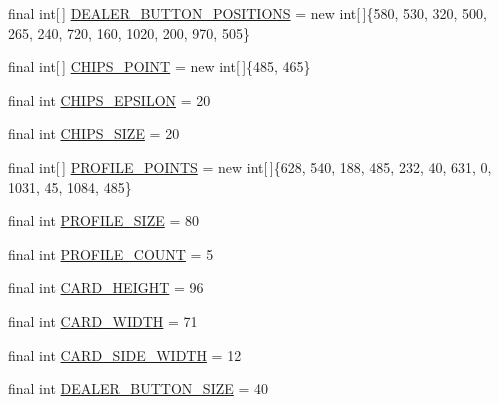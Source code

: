 \begin{DoxyCompactItemize}
\item 
final int\mbox{[}$\,$\mbox{]} \hyperlink{classhu_1_1elte_1_1bfw1p6_1_1poker_1_1client_1_1defaultvalues_1_1_abstract_default_values_a57bc1aea0ed304293a9a958b25011e85}{D\+E\+A\+L\+E\+R\+\_\+\+B\+U\+T\+T\+O\+N\+\_\+\+P\+O\+S\+I\+T\+I\+O\+N\+S} = new int\mbox{[}$\,$\mbox{]}\{580, 530, 320, 500, 265, 240, 720, 160, 1020, 200, 970, 505\}
\item 
final int\mbox{[}$\,$\mbox{]} \hyperlink{classhu_1_1elte_1_1bfw1p6_1_1poker_1_1client_1_1defaultvalues_1_1_abstract_default_values_a444083d2eef89645cc225867f7db4912}{C\+H\+I\+P\+S\+\_\+\+P\+O\+I\+N\+T} = new int\mbox{[}$\,$\mbox{]}\{485, 465\}
\item 
final int \hyperlink{classhu_1_1elte_1_1bfw1p6_1_1poker_1_1client_1_1defaultvalues_1_1_abstract_default_values_a96288859bdb4e06d8e72ed1400f3b0e1}{C\+H\+I\+P\+S\+\_\+\+E\+P\+S\+I\+L\+O\+N} = 20
\item 
final int \hyperlink{classhu_1_1elte_1_1bfw1p6_1_1poker_1_1client_1_1defaultvalues_1_1_abstract_default_values_a796feaef267aa505f67b54ebaeaf854a}{C\+H\+I\+P\+S\+\_\+\+S\+I\+Z\+E} = 20
\item 
final int\mbox{[}$\,$\mbox{]} \hyperlink{classhu_1_1elte_1_1bfw1p6_1_1poker_1_1client_1_1defaultvalues_1_1_abstract_default_values_a3ff3b15d3fd65c091854f26c1005d520}{P\+R\+O\+F\+I\+L\+E\+\_\+\+P\+O\+I\+N\+T\+S} = new int\mbox{[}$\,$\mbox{]}\{628, 540, 188, 485, 232, 40, 631, 0, 1031, 45, 1084, 485\}
\item 
final int \hyperlink{classhu_1_1elte_1_1bfw1p6_1_1poker_1_1client_1_1defaultvalues_1_1_abstract_default_values_a84db9648ccdbbc7ec358714c14e5eda2}{P\+R\+O\+F\+I\+L\+E\+\_\+\+S\+I\+Z\+E} = 80
\item 
final int \hyperlink{classhu_1_1elte_1_1bfw1p6_1_1poker_1_1client_1_1defaultvalues_1_1_abstract_default_values_a2bef1550892a4c6aebb8bcabb36df914}{P\+R\+O\+F\+I\+L\+E\+\_\+\+C\+O\+U\+N\+T} = 5
\item 
final int \hyperlink{classhu_1_1elte_1_1bfw1p6_1_1poker_1_1client_1_1defaultvalues_1_1_abstract_default_values_a41e4190a893687f4b0c7ad9ad38a5dcc}{C\+A\+R\+D\+\_\+\+H\+E\+I\+G\+H\+T} = 96
\item 
final int \hyperlink{classhu_1_1elte_1_1bfw1p6_1_1poker_1_1client_1_1defaultvalues_1_1_abstract_default_values_a7dbe3f95ff10eb11dfb94ec0296808ee}{C\+A\+R\+D\+\_\+\+W\+I\+D\+T\+H} = 71
\item 
final int \hyperlink{classhu_1_1elte_1_1bfw1p6_1_1poker_1_1client_1_1defaultvalues_1_1_abstract_default_values_a617603d27374df3f97777139d372f4ef}{C\+A\+R\+D\+\_\+\+S\+I\+D\+E\+\_\+\+W\+I\+D\+T\+H} = 12
\item 
final int \hyperlink{classhu_1_1elte_1_1bfw1p6_1_1poker_1_1client_1_1defaultvalues_1_1_abstract_default_values_a4bd7e8748694f5c7291069a75be79f86}{D\+E\+A\+L\+E\+R\+\_\+\+B\+U\+T\+T\+O\+N\+\_\+\+S\+I\+Z\+E} = 40
\end{DoxyCompactItemize}


